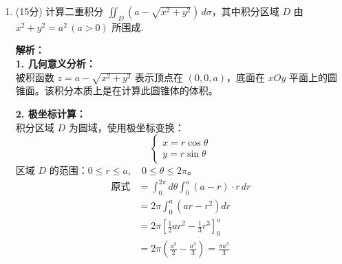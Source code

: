 \documentclass[10pt, a3paper, landscape, twocolumn]{article}
\begin{document}
\begin{enumerate}[start=17]
    \item (15分) 计算二重积分 $\iint_{D} (a - \sqrt{x^2+y^2}) \, d\sigma$，其中积分区域 $D$ 由 $x^2 + y^2 = a^2 \, (a > 0)$ 所围成. \\
    {\color{red} 
    \begin{minipage}[t]{0.55\linewidth} %
        \small \textbf{解析：} \\
        \textbf{1. 几何意义分析：} \\
        被积函数 $z = a - \sqrt{x^2+y^2}$ 表示顶点在 $(0,0,a)$，底面在 $xOy$ 平面上的圆锥面。该积分本质上是在计算此圆锥体的体积。
        
        \textbf{2. 极坐标计算：} \\
        积分区域 $D$ 为圆域，使用极坐标变换：
        $$ \begin{cases} x = r\cos\theta \\ y = r\sin\theta \end{cases} $$
        区域 $D$ 的范围：$0 \le r \le a, \quad 0 \le \theta \le 2\pi$。
        \begin{align*}
            \text{原式} &= \int_0^{2\pi} d\theta \int_0^a (a - r) \cdot r \, dr \\
            &= 2\pi \int_0^a (ar - r^2) dr \\
            &= 2\pi \left[ \frac{1}{2}ar^2 - \frac{1}{3}r^3 \right]_0^a \\
            &= 2\pi \left( \frac{a^3}{2} - \frac{a^3}{3} \right) = \frac{\pi a^3}{3}
        \end{align*}
    \end{minipage}%
    \hfill
    \begin{minipage}[t]{0.4\linewidth} %
        \centering
        \vspace{0pt}
\end{minipage}}
\end{enumerate}
\end{document}
